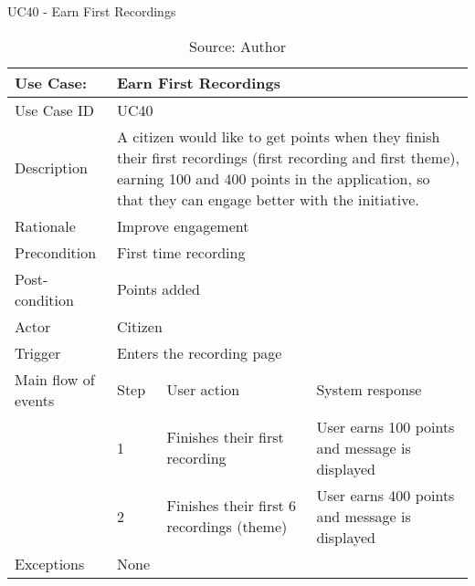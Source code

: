 \begin{table}[h]
\centering
\caption{UC40 - Earn First Recordings}
\label{uc:40}
\begin{tabular}{|p{3cm}|p{1cm}|p{5cm}|p{5cm}|}
\hline
Use Case:       & \multicolumn{3}{p{11cm}|}{Earn First Recordings} \\ \hline
Use Case ID     & \multicolumn{3}{p{11cm}|}{UC40} \\ \hline
Description     & \multicolumn{3}{p{11cm}|}{A citizen would like to get points when they finish their first recordings (first recording and first theme), earning 100 and 400 points in the application, so that they can engage better with the initiative.} \\ \hline
Rationale       & \multicolumn{3}{p{11cm}|}{Improve engagement} \\ \hline
Precondition    & \multicolumn{3}{p{11cm}|}{First time recording} \\ \hline
Post-condition  & \multicolumn{3}{p{11cm}|}{Points added} \\ \hline
Actor           & \multicolumn{3}{p{11cm}|}{Citizen} \\ \hline
Trigger         & \multicolumn{3}{p{11cm}|}{Enters the recording page} \\ \hline
Main flow of events & Step  & User action & System response \\ \hline
                    & 1     & Finishes their first recording & User earns 100 points and message is displayed  \\ \hline
                    & 2     & Finishes their first 6 recordings (theme) & User earns 400 points and message is displayed \\ \hline
Exceptions      & \multicolumn{3}{p{11cm}|}{None} \\ \hline
\end{tabular}
\caption*{Source: Author}
\end{table}

